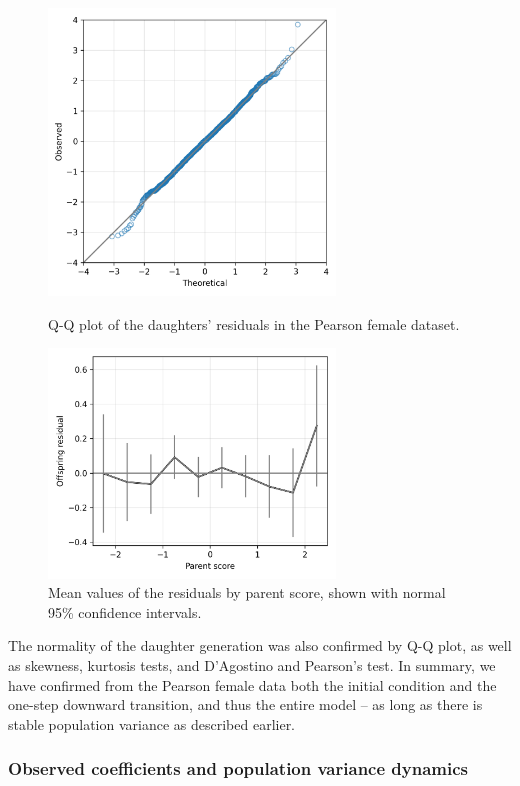 \documentclass[a4paper,11pt]{article} %
\begin{document}
\begin{figure}[p]
\includegraphics[width=3in]{figures/qq_pearson_epsi.png}
\centering
\caption{Q-Q plot of the daughters' residuals in the Pearson female dataset.}
\label{fig:qq_pearson_epsi}

\vspace{2cm}

\includegraphics[width=3in]{figures/pearson_residuals_by_score.png}
\centering
\caption{Mean values of the residuals by parent score, shown with normal 95\% confidence intervals.}
\label{fig:pearson_residuals_by_score}
\end{figure}

The normality of the daughter generation was also confirmed by Q-Q plot, as well as skewness, kurtosis tests, and D’Agostino and Pearson's test. In summary, we have confirmed from the Pearson female data both the initial condition and the one-step downward transition, and thus the entire model -- as long as there is stable population variance as described earlier. 


\subsubsection*{Observed coefficients and population variance dynamics}
\end{document}

